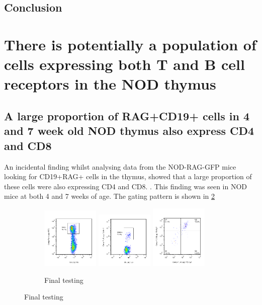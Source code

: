 \subsection{Conclusion}




\section{There is potentially a population of cells expressing both T and B cell receptors in the NOD thymus}

\subsection{A large proportion of RAG+CD19+ cells in 4 and 7 week old NOD thymus also express CD4 and CD8}
An incidental finding whilst analysing data from the NOD-RAG-GFP mice looking for CD19+RAG+ cells in the thymus, showed that a large proportion of these cells were also expressing CD4 and CD8. . 
This finding was seen in NOD mice at both 4 and 7 weeks of age.
The gating pattern is shown in \cref{fig:RAGposDP}

\begin{figure}	
	\begin{subfigure}{\textwidth}
		\includegraphics[width=0.3\textwidth] {Figures/RAGposthy1241014.png}
		\hfill	
		\includegraphics[width=0.3\textwidth] {Figures/RAGCD19posthy1}		
		\hfill	
		\includegraphics[width=0.3\textwidth] {Figures/RAGCD19CD4CD8posthy1}
		\caption{Final testing}
		\label{fig:RAGposDP}
	\end{subfigure}
\end{figure}



